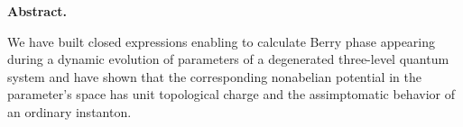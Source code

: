 \documentclass[a4paper]{article}
\begin{document}
\begin{center}
{\bf Abstract. }
\end{center}

\begin{center}
 We have built closed expressions enabling to calculate Berry phase
 appearing during a dynamic evolution of parameters
 of a degenerated three-level quantum system and have shown that
 the corresponding nonabelian potential in the parameter's space
 has unit topological charge and the assimptomatic behavior
 of an ordinary instanton.
\end{center}
\end{document}

